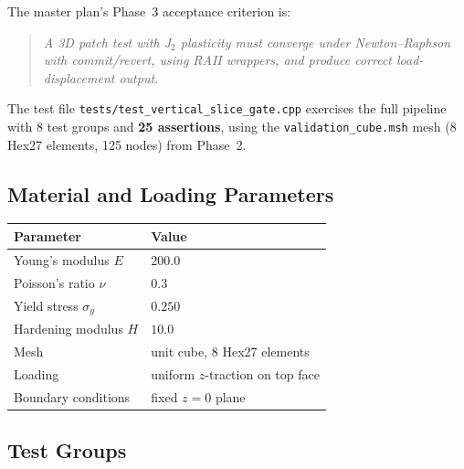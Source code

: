 The master plan's Phase~3 acceptance criterion is:

\begin{quote}
\itshape
A 3D patch test with J$_2$ plasticity must converge under
Newton--Raphson with commit/revert, using RAII wrappers, and produce
correct load-displacement output.
\end{quote}

The test file \texttt{tests/test\_vertical\_slice\_gate.cpp} exercises
the full pipeline with 8 test groups and \textbf{25 assertions},
using the \texttt{validation\_cube.msh} mesh (8 Hex27 elements, 125
nodes) from Phase~2.

\subsection{Material and Loading Parameters}

\begin{center}
\begin{tabular}{ll}
  \toprule
  Parameter & Value \\
  \midrule
  Young's modulus $E$  & $200.0$ \\
  Poisson's ratio $\nu$ & $0.3$ \\
  Yield stress $\sigma_y$ & $0.250$ \\
  Hardening modulus $H$ & $10.0$ \\
  Mesh & unit cube, 8 Hex27 elements \\
  Loading & uniform $z$-traction on top face \\
  Boundary conditions & fixed $z=0$ plane \\
  \bottomrule
\end{tabular}
\end{center}

\subsection{Test Groups}

